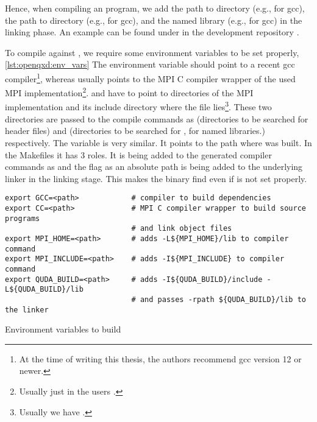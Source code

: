 
Hence, when compiling an \openqxd program, we add the path to \qudas {} directory (e.g.,  for gcc), the path to \qudas {} directory (e.g.,  for gcc), and the named library (e.g.,  for gcc) in the linking phase. An example  can be found under  in the \openqxd development repository \cite{gitlab:openqxd-devel}.

To compile \openqxd against \quda, we require some environment variables to be set properly, \cref{lst:openqxd:env_vars}
The environment variable  should point to a recent gcc compiler\footnote{At the time of writing this thesis, the authors recommend gcc version 12 or newer.}, whereas  usually points to the MPI C compiler wrapper of the used MPI implementation\footnote{Usually just  in the users .}.
 and  have to point to directories of the MPI implementation and its include directory where the file  lies\footnote{Usually we have .}.
These two directories are passed to the compile commands as  (directories to be searched for header files) and  (directories to be searched for , \ie for named libraries.) respectively.
The variable  is very similar.
It points to the path where \quda was built.
In the Makefiles it has 3 roles.
It is being added to the generated compiler commands as  and the flag  as an absolute path is being added to the underlying linker in the linking stage.
This makes the binary find  even if  is not set properly.
\begin{codelisting}
\begin{verbatim}
export GCC=<path>            # compiler to build dependencies
export CC=<path>             # MPI C compiler wrapper to build source programs
                             # and link object files
export MPI_HOME=<path>       # adds -L${MPI_HOME}/lib to compiler command
export MPI_INCLUDE=<path>    # adds -I${MPI_INCLUDE} to compiler command
export QUDA_BUILD=<path>     # adds -I${QUDA_BUILD}/include -L${QUDA_BUILD}/lib
                             # and passes -rpath ${QUDA_BUILD}/lib to the linker
\end{verbatim}
\caption{Environment variables to build \openqxd}
\label{lst:openqxd:env_vars}
\end{codelisting}


